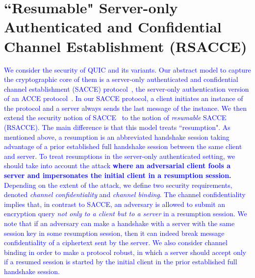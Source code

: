 \section{``Resumable" Server-only Authenticated and Confidential Channel Establishment (RSACCE)} \label{sec:rsacce}
\textcolor{blue}{
We consider the security of QUIC and its variants.
Our abstract model to capture the cryptographic core of them is a server-only
authenticated and confidential channel establishment (SACCE) protocol~\cite{KPW13:SACCE},
the server-only authentication version of an ACCE protocol~\cite{JKSS12:ACCE}.
In our SACCE protocol, a client initiates an instance of the protocol and
a server always sends the last message of the instance.
We then extend the security notion of SACCE~\cite{KPW13:SACCE}
to the notion of \textit{resumable} SACCE (RSACCE).
The main difference is that this model treats ``resumption".
As mentioned above, a resumption is an abbreviated handshake session
taking advantage of a prior established full handshake session
between the same client and server.
To treat resumptions in the server-only authenticated setting,
we should take into account the attack \textbf{where an adversarial client fools a server
and impersonates the initial client in a resumption session.}
Depending on the extent of the attack, we define two security requirements,
denoted \textit{channel confidentiality} and \textit{channel binding}.
The channel confidentiality implies that, in contrast to SACCE,
an adversary is allowed to submit
an encryption query \textit{not only to a client but to a server} in a resumption session.
We note that if an adversary can make a handshake with a server with the same session
key in some resumption session, then it can indeed break message confidentiality of
a ciphertext sent by the server.
We also consider channel binding in order to make a protocol robust,
in which a server should accept
only if a resumed session is started by the initial client
in the prior established full handshake session.
}




